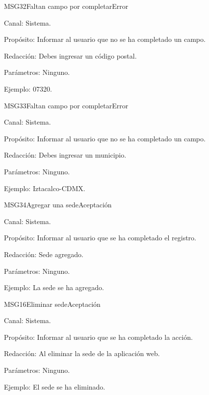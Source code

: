 \begin{mensaje}{MSG32}{Faltan campo por completar}{Error}
	\item[Canal:] Sistema.
	\item[Propósito:] Informar al usuario que no se ha completado un campo.
	\item[Redacción:] Debes ingresar un código postal.
	\item[Parámetros:] Ninguno.
	\item[Ejemplo:] 07320.
\end{mensaje}
\newline


\begin{mensaje}{MSG33}{Faltan campo por completar}{Error}
	\item[Canal:] Sistema.
	\item[Propósito:] Informar al usuario que no se ha completado un campo.
	\item[Redacción:] Debes ingresar un municipio.
	\item[Parámetros:] Ninguno.
	\item[Ejemplo:] Iztacalco-CDMX.
\end{mensaje}
\newline


\begin{mensaje}{MSG34}{Agregar una sede}{Aceptación}
	\item[Canal:] Sistema.
	\item[Propósito:] Informar al usuario que se ha completado el registro.
	\item[Redacción:] Sede agregado.
	\item[Parámetros:] Ninguno.
	\item[Ejemplo:] La sede se ha agregado.
\end{mensaje}
\newline


\begin{mensaje}{MSG16}{Eliminar sede}{Aceptación}
	\item[Canal:] Sistema.
	\item[Propósito:] Informar al usuario que se ha completado la acción.
	\item[Redacción:] Al eliminar la sede de la aplicación web.
	\item[Parámetros:] Ninguno.
	\item[Ejemplo:] El sede se ha eliminado.
\end{mensaje}
\newline